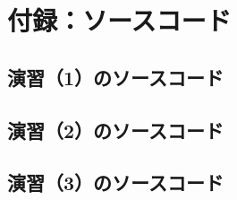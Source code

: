 \documentclass[a4paper,11pt,dvipdfmx]{jsarticle}
\begin{document}
\newpage
\section{付録：ソースコード}
\subsection{演習（1）のソースコード}


\subsection{演習（2）のソースコード}


\subsection{演習（3）のソースコード}

\end{document}
